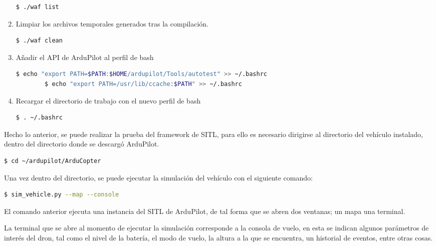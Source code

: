 \begin{enumerate}
    \begin{lstlisting}[language = bash]
        $ ./waf list
    \end{lstlisting}

    \item Limpiar los archivos temporales generados tras la compilación.
    
    \begin{lstlisting}[language = bash]
        $ ./waf clean
    \end{lstlisting}

    \item Añadir el API de ArduPilot al perfil de bash
    
    \begin{lstlisting}[language = bash]
        $ echo "export PATH=$PATH:$HOME/ardupilot/Tools/autotest" >> ~/.bashrc
        $ echo "export PATH=/usr/lib/ccache:$PATH" >> ~/.bashrc 
    \end{lstlisting}  

    \item Recargar el directorio de trabajo con el nuevo perfil de bash
    
    \begin{lstlisting}[language = bash]
        $ . ~/.bashrc
    \end{lstlisting}  

\end{enumerate}

Hecho lo anterior, se puede realizar la prueba del  framework de SITL, para ello es necesario dirigirse al directorio del vehículo instalado, dentro del directorio donde se descargó ArduPilot. 

\begin{lstlisting}[language = bash]
    $ cd ~/ardupilot/ArduCopter
\end{lstlisting}  

Una vez dentro del directorio, se puede ejecutar la simulación del vehículo con el siguiente comando:

\begin{lstlisting}[language = bash]
    $ sim_vehicle.py --map --console
\end{lstlisting}  

El comando anterior ejecuta una instancia del SITL de ArduPilot, de tal forma que se abren dos ventanas; un mapa una terminal.

La terminal que se abre al momento de ejecutar la simulación corresponde a la consola de vuelo, en esta se indican algunos parámetros de interés del dron, tal como el nivel de la batería, el modo de vuelo, la altura a la que se encuentra, un historial de eventos, entre otras cosas.

